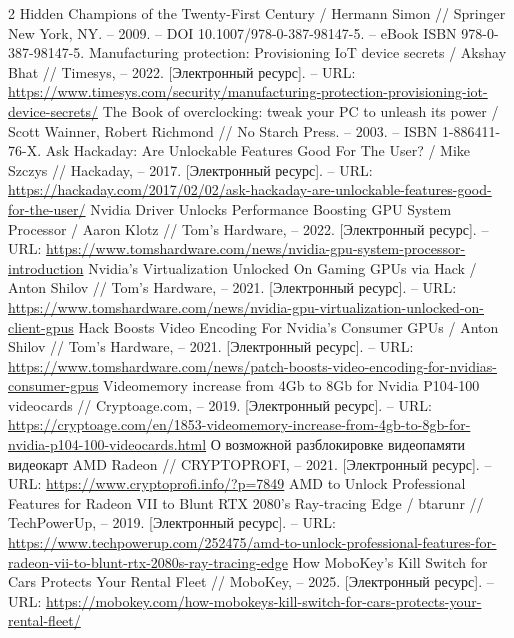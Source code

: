 \documentclass{article}
\begin{document}
\begin{thebibliography}{2}
 Hidden Champions of the Twenty-First Century / Hermann Simon // Springer New York, NY. – 2009. – DOI 10.1007/978-0-387-98147-5. – eBook ISBN 978-0-387-98147-5.
 Manufacturing protection: Provisioning IoT device secrets / Akshay Bhat // Timesys, – 2022. [Электронный ресурс]. – URL: \url{https://www.timesys.com/security/manufacturing-protection-provisioning-iot-device-secrets/}
 The Book of overclocking: tweak your PC to unleash its power / Scott Wainner, Robert Richmond // No Starch Press. – 2003. – ISBN 1-886411-76-X.
 Ask Hackaday: Are Unlockable Features Good For The User? / Mike Szczys // Hackaday, – 2017. [Электронный ресурс]. – URL: \url{https://hackaday.com/2017/02/02/ask-hackaday-are-unlockable-features-good-for-the-user/}
 Nvidia Driver Unlocks Performance Boosting GPU System Processor / Aaron Klotz // Tom's Hardware, – 2022. [Электронный ресурс]. – URL: \url{https://www.tomshardware.com/news/nvidia-gpu-system-processor-introduction}
 Nvidia's Virtualization Unlocked On Gaming GPUs via Hack / Anton Shilov // Tom's Hardware, – 2021. [Электронный ресурс]. – URL: \url{https://www.tomshardware.com/news/nvidia-gpu-virtualization-unlocked-on-client-gpus}
 Hack Boosts Video Encoding For Nvidia's Consumer GPUs / Anton Shilov // Tom's Hardware, – 2021. [Электронный ресурс]. – URL: \url{https://www.tomshardware.com/news/patch-boosts-video-encoding-for-nvidias-consumer-gpus}
 Videomemory increase from 4Gb to 8Gb for Nvidia P104-100 videocards // Cryptoage.com, – 2019. [Электронный ресурс]. – URL: \url{https://cryptoage.com/en/1853-videomemory-increase-from-4gb-to-8gb-for-nvidia-p104-100-videocards.html}
 О возможной разблокировке видеопамяти видеокарт AMD Radeon // CRYPTOPROFI, – 2021. [Электронный ресурс]. – URL: \url{https://www.cryptoprofi.info/?p=7849}
 AMD to Unlock Professional Features for Radeon VII to Blunt RTX 2080's Ray-tracing Edge / btarunr // TechPowerUp, – 2019. [Электронный ресурс]. – URL: \url{https://www.techpowerup.com/252475/amd-to-unlock-professional-features-for-radeon-vii-to-blunt-rtx-2080s-ray-tracing-edge}
 How MoboKey’s Kill Switch for Cars Protects Your Rental Fleet // MoboKey, – 2025. [Электронный ресурс]. – URL: \url{https://mobokey.com/how-mobokeys-kill-switch-for-cars-protects-your-rental-fleet/}

\end{thebibliography}
\end{document}
